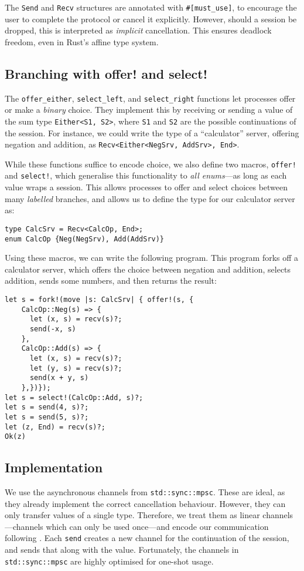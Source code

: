 \documentclass[sigconf,natbib=false]{acmart}
\begin{document}
The \lstinline{Send} and \lstinline{Recv} structures are annotated with \lstinline{#[must_use]}, to encourage the user to complete the protocol or cancel it explicitly. However, should a session be dropped, this is interpreted as \emph{implicit} cancellation. This ensures deadlock freedom, even in Rust's affine type system.

\subsection*{Branching with offer! and select!}
The \lstinline{offer_either}, \lstinline{select_left}, and \lstinline{select_right} functions let processes offer or make a \emph{binary} choice. They implement this by receiving or sending a value of the sum type \lstinline{Either<S1, S2>}, where \lstinline{S1} and \lstinline{S2} are the possible continuations of the session. For instance, we could write the type of a ``calculator'' server, offering negation and addition, as \lstinline{Recv<Either<NegSrv, AddSrv>, End>}.

While these functions suffice to encode choice, we also define two macros, \lstinline{offer!} and \lstinline{select!}, which generalise this functionality to \emph{all enums}---as long as each value wraps a session. This allows processes to offer and select choices between many \emph{labelled} branches, and allows us to define the type for our calculator server as:
\begin{lstlisting}
type CalcSrv = Recv<CalcOp, End>;
enum CalcOp {Neg(NegSrv), Add(AddSrv)}
\end{lstlisting}
Using these macros, we can write the following program. This program forks off a calculator server, which offers the choice between negation and addition, selects addition, sends some numbers, and then returns the result:
\begin{lstlisting}
let s = fork!(move |s: CalcSrv| { offer!(s, {
    CalcOp::Neg(s) => {
      let (x, s) = recv(s)?;
      send(-x, s)
    },
    CalcOp::Add(s) => {
      let (x, s) = recv(s)?;
      let (y, s) = recv(s)?;
      send(x + y, s)
    },})});
let s = select!(CalcOp::Add, s)?;
let s = send(4, s)?;
let s = send(5, s)?;
let (z, End) = recv(s)?;
Ok(z)
\end{lstlisting}

\subsection*{Implementation}
We use the asynchronous channels from \lstinline{std::sync::mpsc}. These are ideal, as they already implement the correct cancellation behaviour. However, they can only transfer values of a single type. Therefore, we treat them as linear channels---channels which can only be used once---and encode our communication following \textcite{dardha2017}. Each \lstinline{send} creates a new channel for the continuation of the session, and sends that along with the value. Fortunately, the channels in \lstinline{std::sync::mpsc} are highly optimised for one-shot usage.
\end{document}
